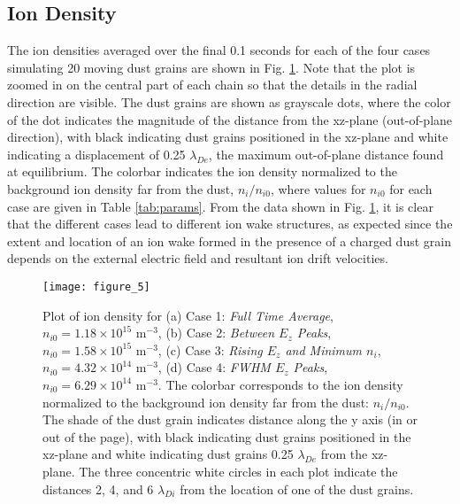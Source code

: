 \documentclass[aip,amsmath,amssymb,graphicx,floatfix,reprint]{revtex4-1}
\begin{document}
\subsection{Ion Density}
\label{ionden}
The ion densities averaged over the final 0.1 seconds for each of the four cases simulating 20 moving dust grains are shown in Fig. \ref{fig:ionden}.  Note that the plot is zoomed in on the central part of each chain so that the details in the radial direction are visible.  The dust grains are shown as grayscale dots, where the color of the dot indicates the magnitude of the distance from the xz-plane (out-of-plane direction), with black indicating dust grains positioned in the xz-plane and white indicating a displacement of 0.25 $\lambda_{De}$, the maximum out-of-plane distance found at equilibrium.  The colorbar indicates the ion density normalized to the background ion density far from the dust, $n_i/n_{i0}$, where values for $n_{i0}$ for each case are given in Table \ref{tab:params}.  From the data shown in Fig. \ref{fig:ionden}, it is clear that the different cases lead to different ion wake structures, as expected since the extent and location of an ion wake formed in the presence of a charged dust grain depends on the external electric field and resultant ion drift velocities.  

\begin{figure}[t]
\texttt{[image: figure\_5]}
\caption{Plot of ion density for (a) Case 1: \emph{Full Time Average}, $n_{i0} = 1.18\times 10^{15}$ m$^{-3}$, (b) Case 2: \emph{Between $E_z$ Peaks}, $n_{i0} = 1.58\times 10^{15}$ m$^{-3}$, (c) Case 3: \emph{Rising $E_z$ and Minimum $n_i$}, $n_{i0} = 4.32\times 10^{14}$ m$^{-3}$, (d) Case 4: \emph{FWHM $E_z$ Peaks}, $n_{i0} = 6.29\times 10^{14}$ m$^{-3}$.  The colorbar corresponds to the ion density normalized to the background ion density far from the dust: $n_i / n_{i0}$.  The shade of the dust grain indicates distance along the y axis (in or out of the page), with black indicating dust grains positioned in the xz-plane and white indicating dust grains 0.25 $\lambda_{De}$ from the xz-plane.  The three concentric white circles in each plot indicate the distances 2, 4, and 6 $\lambda_{Di}$ from the location of one of the dust grains.}
\label{fig:ionden}
\end{figure}
\end{document}
